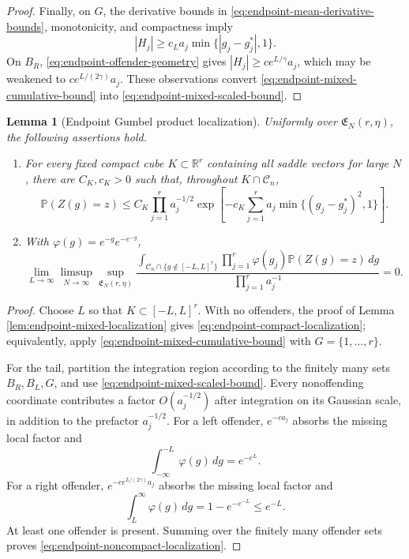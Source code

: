 \documentclass[11pt]{article}
\newtheorem{lemma}[theorem]{Lemma}
\theoremstyle{remark}
\newcommand{\Pp}{\mathbb P}
\newcommand{\dd}{\,d}
\begin{document}
\begin{proof}
Finally, on \(G\), the derivative bounds in
\eqref{eq:endpoint-mean-derivative-bounds}, monotonicity, and compactness imply
\[
        |H_j|\ge c_La_j\min\{|g_j-g_j^*|,1\}.
\tag{8.26}\label{eq:endpoint-mean-displacement}
\]
On \(B_R\), \eqref{eq:endpoint-offender-geometry} gives
\(|H_j|\ge ce^{L/\gamma}a_j\), which may be weakened to
\(ce^{L/(2\gamma)}a_j\).  These observations convert
\eqref{eq:endpoint-mixed-cumulative-bound} into
\eqref{eq:endpoint-mixed-scaled-bound}.
\end{proof}

\begin{lemma}[Endpoint Gumbel product localization]
\label{lem:endpoint-gumbel-localization}
Uniformly over \(\mathfrak E_N(r,\eta)\), the following assertions hold.

\begin{enumerate}[label=(\roman*)]
\item For every fixed compact cube \(K\subset\mathbb R^r\) containing all
saddle vectors for large \(N\), there are \(C_K,c_K>0\) such that, throughout
\(K\cap\mathscr C_n\),
\[
        \Pp(Z(g)=z)
        \le C_K\prod_{j=1}^ra_j^{-1/2}
        \exp\left[-c_K\sum_{j=1}^r
        a_j\min\{(g_j-g_j^*)^2,1\}\right].
\tag{8.27}\label{eq:endpoint-compact-localization}
\]
\item With \(\varphi(g)=e^{-g}e^{-e^{-g}}\),
\[
\lim_{L\to\infty}\limsup_{N\to\infty}
\sup_{\mathfrak E_N(r,\eta)}
\frac{
\displaystyle
\int_{\mathscr C_n\cap\{g\notin[-L,L]^r\}}
\prod_{j=1}^r\varphi(g_j)\Pp(Z(g)=z)\dd g
}{\prod_{j=1}^ra_j^{-1}}=0.
\tag{8.28}\label{eq:endpoint-noncompact-localization}
\]
\end{enumerate}
\end{lemma}

\begin{proof}Choose \(L\) so that \(K\subset[-L,L]^r\).  With no offenders, the proof of
Lemma \ref{lem:endpoint-mixed-localization} gives
\eqref{eq:endpoint-compact-localization}; equivalently, apply
\eqref{eq:endpoint-mixed-cumulative-bound} with \(G=\{1,\ldots,r\}\).

For the tail, partition the integration region according to the finitely many
sets \(B_R,B_L,G\), and use \eqref{eq:endpoint-mixed-scaled-bound}.  Every
nonoffending coordinate contributes a factor \(O(a_j^{-1/2})\) after
integration on its Gaussian scale, in addition to the prefactor
\(a_j^{-1/2}\).  For a left offender, \(e^{-ca_j}\) absorbs the missing local
factor and
\[
        \int_{-\infty}^{-L}\varphi(g)\dd g=e^{-e^L}.
\]
For a right offender, \(e^{-ce^{L/(2\gamma)}a_j}\) absorbs the missing local
factor and
\[
        \int_L^\infty\varphi(g)\dd g
        =1-e^{-e^{-L}}\le e^{-L}.
\]
At least one offender is present.  Summing over the finitely many offender sets
proves \eqref{eq:endpoint-noncompact-localization}.
\end{proof}
\end{document}
